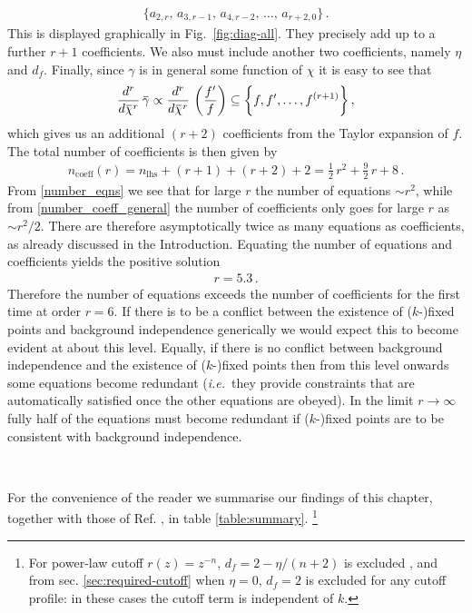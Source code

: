 \documentclass[11pt]{book}
\newcommand{\overbar}[1]{\mkern 1.5mu\overline{\mkern-1.5mu#1\mkern-1.5mu}\mkern 1.5mu}
\newcommand{\bg}{\overbar \gamma}
\newcommand{\bc}{\overbar \chi}
\newcommand\ie{\textit{i.e.}\ }
\numberwithin{equation}{chapter}
\begin{document}
\begin{align}
  \bigg\lbrace
  a_{\scriptscriptstyle 2,r},\, a_{\scriptscriptstyle 3,r-1},\,
  a_{\scriptscriptstyle 4,r-2},\, \dots,\, a_{\scriptscriptstyle r+2,0}
  \bigg\rbrace \,.
\end{align}
This is displayed graphically in Fig.~\ref{fig:diag-all}.
They precisely add up to a further $r+1$ coefficients.
We also must include another two coefficients, namely $\eta$ and $d_f$.
Finally, since $\gamma$ is in general some function of $\chi$ it is easy to see that
\begin{align}
  \frac{d^r}{d \bc^r} \, \bg \propto \frac{d^r}{d \bc^r} \, \left( \frac{f'}{f}\right) \subseteq
  \bigg\lbrace f, f', \dots, f^{(r+1)}   \bigg\rbrace \,,
\end{align}
which gives us an additional $(r+2)$ coefficients from the Taylor expansion of $f$.
The total number of coefficients is then given by
\begin{align}
  \label{number_coeff_general}
  n_{\text{coeff}}(r) = n_{\text{lhs}} + (r+1) + (r+2) + 2  = \frac{1}{2} \, r^2 + \frac{9}{2} \, r + 8 \,.
\end{align}
From \eqref{number_eqns} we see that for large $r$ the number of equations $\sim r^2$,
while from \eqref{number_coeff_general} the number of coefficients only goes for large $r$ as $\sim r^2/2$.
There are therefore asymptotically twice as many equations as coefficients,
as already discussed in the Introduction.
Equating the number of equations and coefficients yields the positive solution
\begin{align}
  r = 5.3 \,.
\end{align}
Therefore the number of equations exceeds the number of coefficients for the first time at order $r=6$.
If there is to be a conflict between the existence of ($k$-)fixed points and background independence
generically we would expect this to become evident at about this level.
Equally, if there is no conflict between background independence and the existence of ($k$-)fixed points
then from this level onwards some equations become redundant
(\ie they provide constraints that are automatically satisfied once the other equations are obeyed).
In the limit $r\to\infty$ fully half of the equations must become redundant if ($k$-)fixed points are
to be consistent with background independence.

~

For the convenience of the reader we summarise our findings of this chapter,
together with those of Ref. \cite{Dietz:2015owa}, in table \ref{table:summary}.%
\footnote{
  For power-law cutoff  $r(z)=z^{-n}$, $d_f = 2-\eta/(n+2)$ is excluded \cite{Dietz:2015owa},
  and from sec. \ref{sec:required-cutoff} when $\eta=0$,  $d_f=2$ is excluded for any cutoff profile:
  in these cases the cutoff term is independent of $k$.
}
\end{document}
